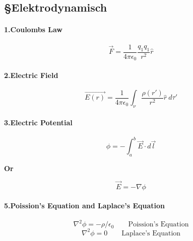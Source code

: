 \documentclass[a4paper]{article}
\numberwithin{equation}{subsection}  %
\begin{document}
\paragraph{}%
\paragraph{}
\begin{center}
	\subsection*{\S Elektrodynamisch}
\end{center}
\paragraph{1.Coulombs Law}
\begin{equation}
	\vec{F} = \frac{1}{4\pi\epsilon_0} \frac{q_1 q_1}{r^2} \hat{r} 
\end{equation}
\paragraph{2.Electric Field}
\begin{equation}
\vec{E(  r)} = \frac{1}{4\pi\epsilon_0} \int_{\nu} \frac{\rho(r')}{r^2} \hat{r}\ d\tau '
\end{equation}
\paragraph{3.Electric Potential}
\begin{equation}
\phi = - \int_{a}^{b} \vec{E}\cdot d\vec{l}
\end{equation}
\begin{center}
	\textbf{Or}
\end{center}
\begin{equation*}
	\vec{E} = -\nabla \phi
\end{equation*}

\paragraph{5.Poission's Equation and Laplace's Equation}
\begin{equation}
\label{poission}
 \nabla^2 \phi = -\rho/\epsilon_0\qquad \text{Poission's Equation}
\end{equation}
\begin{equation}
\label{poission}
\nabla^2 \phi = 0\qquad \text{Laplace's Equation}
\end{equation}
\end{document}
